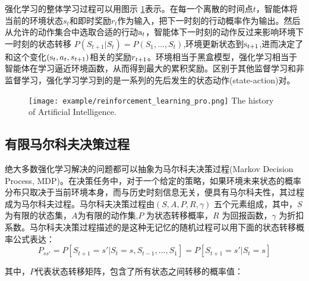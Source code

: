 强化学习的整体学习过程可以用图示 \ref{fig:1}表示。在每一个离散的时间点$t$，智能体将当前的环境状态${s_t}$和即时奖励${r_t}$作为输入，把下一时刻的行动概率作为输出。然后从允许的动作集合中选取合适的行动${{\rm{a}}_t}$，智能体下一时刻的动作反过来影响环境下一时刻的状态转移 $P({S_{t + 1}}|{S_t}) = P({S_1},...,{S_t})$,环境更新状态到${{\rm{s}}_{t + 1}}$,进而决定了和这个变化$\left( {{{\rm{s}}_t},{a_t},{s_{t + 1}}} \right)$相关的奖励${r_{t{\rm{ + }}1}}$。环境相当于黑盒模型，强化学习相当于智能体在学习逼近环境函数，从而得到最大的累积奖励。区别于其他监督学习和非监督学习，强化学习学习到的是一系列的先后发生的状态动作(state-action)对。

\begin{figure}[!htpb]
	\centering
	\texttt{[image: example/reinforcement\_learning\_pro.png]}
	{The history of Artificial Intelligence.}
	\label{fig:1}
\end{figure}
\subsection{有限马尔科夫决策过程}
绝大多数强化学习解决的问题都可以抽象为马尔科夫决策过程(Markov Decision Process, MDP)。在决策任务中，对于一个给定的策略，如果环境未来状态的概率分布只取决于当前环境本身，而与历史时刻信息无关，便具有马尔科夫性，其过程成为马尔科夫过程。马尔科夫决策过程由$(S,A,P,R,\gamma )$ 五个元素组成，其中，$S$ 为有限的状态集，$ A $为有限的动作集,$P$ 为状态转移概率，$ R $ 为回报函数，$\gamma$ 为折扣系数。马尔科夫决策过程描述的是这种无记忆的随机过程可以用下面的状态转移概率公式表达：
\begin{equation}
\label{eq:2}
{P_{ss'}} = P[{S_{t + 1}} = s'|{S_t} = s,{S_{t - 1}},...,{S_1}] = P[{S_{t + 1}} = s'|{S_t} = s]
\end{equation}

其中，$ P $代表状态转移矩阵，包含了所有状态之间转移的概率值：

